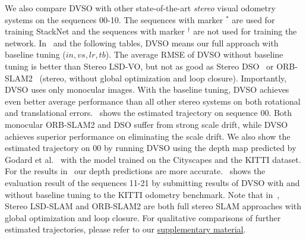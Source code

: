 \documentclass[runningheads]{llncs}
\begin{document}
We also compare DVSO with other state-of-the-art \emph{stereo} visual 
odometry systems on the sequences 00-10. The sequences with marker $^*$ are 
used for training StackNet and the sequences with marker $^\dagger$ are not 
used for training the network. In~ and 
the following tables, DVSO means our full approach with baseline tuning ($in,vs,lr,tb$). 
The average RMSE of DVSO without baseline tuning is better than Stereo 
LSD-VO, but not as good as Stereo DSO~\cite{wang2017stereoDSO} or 
ORB-SLAM2~\cite{mur2017orb} (stereo, without global optimization and loop closure).
Importantly, DVSO uses only monocular images. With the baseline tuning, 
DVSO achieves even better average performance than all other stereo systems 
on both rotational and translational errors.~ shows the 
estimated trajectory on sequence 00. Both monocular 
ORB-SLAM2 and DSO suffer from strong scale drift, while DVSO achieves 
superior performance on eliminating the scale drift. We also show the estimated 
trajectory on 00 by running DVSO using the 
depth map predicted by Godard et 
al.~\cite{godard2016unsupervised} with the model trained on the Cityscapes 
and the KITTI dataset. For the results in~ 
our depth predictions are more accurate.~ shows 
the evaluation result of the sequences 11-21 by submitting results of DVSO with and without baseline tuning to the KITTI odometry 
benchmark.
Note that 
in~, Stereo LSD-SLAM and ORB-SLAM2 are both full 
stereo SLAM approaches with global optimization and loop closure. 
For qualitative comparisons of further 
estimated trajectories, please refer to our 
\href{https://vision.in.tum.de/_media/spezial/bib/yang2018dvso-supp.pdf}{supplementary
	material}.
\end{document}
